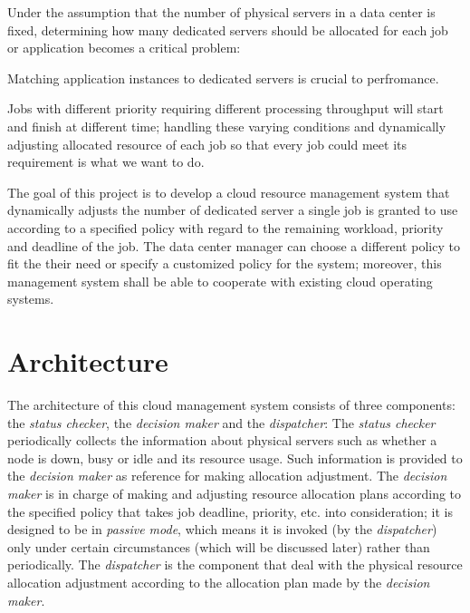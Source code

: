 \documentclass[11pt]{article}
\begin{document}
Under the assumption that the number of physical servers in a data
center is fixed, determining how many dedicated servers should be
allocated for each job or application becomes a critical problem:

Matching application instances to dedicated servers is crucial to
perfromance.

Jobs with different priority requiring different processing throughput
will start and finish at different time; handling these varying
conditions and dynamically adjusting allocated resource of each job so
that every job could meet its requirement is what we want to do.

The goal of this project is to develop a cloud resource management
system that dynamically adjusts the number of dedicated server a
single job is granted to use according to a specified policy with
regard to the remaining workload, priority and deadline of the
job. The data center manager can choose a different policy to fit the
their need or specify a customized policy for the system; moreover,
this management system shall be able to cooperate with existing cloud
operating systems.


\section{Architecture}


The architecture of this cloud management system consists of three
components: the \emph{status checker}, the \emph{decision maker} and the
\emph{dispatcher}:  The \emph{status checker} periodically collects the
information about physical servers such as whether a node is down, busy
or idle and its resource usage.  Such information is provided to the
\emph{decision maker} as reference for making allocation adjustment.
The \emph{decision maker} is in charge of making and adjusting resource
allocation plans according to the specified policy that takes job
deadline, priority, etc. into consideration; it is designed to be in
\emph{passive mode}, which means it is invoked (by the
\emph{dispatcher}) only under certain circumstances (which will be
discussed later) rather than periodically.  The \emph{dispatcher} is the
component that deal with the physical resource allocation adjustment
according to the allocation plan made by the \emph{decision maker}.
\end{document}
